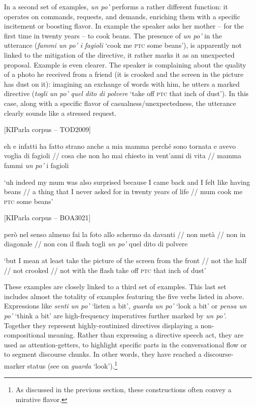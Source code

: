 In a second set of examples, \textit{un po’} performs a rather different function: it operates on commands, requests, and demands, enriching them with a specific incitement or boosting flavor. In example  the speaker asks her mother – for the first time in twenty years – to cook beans. The presence of \textit{un po’} in the utterance (\textit{fammi un po’ i fagioli} ‘cook me \textsc{ptc} some beans’), is apparently not linked to the mitigation of the directive, it rather marks it as an unexpected proposal. Example  is even clearer. The speaker is complaining about the quality of a photo he received from a friend (it is crooked and the screen in the picture has dust on it): imagining an exchange of words with him, he utters a marked directive (\textit{togli un po’ quel dito di polvere} ‘take off \textsc{ptc} that inch of dust’). In this case, along with a specific flavor of casualness/unexpectedness, the utterance clearly sounds like a stressed request.

\ea%
    \label{ex:key:71} [KIParla corpus – TOD2009]

eh e infatti ha fatto strano anche a mia mamma perché sono tornata e avevo voglia di fagioli // cosa che non ho mai chiesto in vent’anni di vita // mamma fammi \textit{un po’} i fagioli

\glt ‘uh indeed my mum was also surprised because I came back and I felt like having beans // a thing that I never asked for in twenty years of life // mum cook me \textsc{ptc} some beans’
\z

\ea%
    \label{ex:key:72}

          [KIParla corpus – BOA3021]

però nel senso almeno fai la foto allo schermo da davanti // non metà // non in diagonale // non con il flash togli \textit{un po’} quel dito di polvere

\glt ‘but I mean at least take the picture of the screen from the front // not the half // not crooked // not with the flash take off \textsc{ptc} that inch of dust’
    \z %

These examples are closely linked to a third set of examples. This last set includes almost the totality of examples featuring the five verbs listed in  above. Expressions like \textit{senti un po’} ‘listen a bit’, \textit{guarda un po’} ‘look a bit’ or \textit{pensa un po’} ‘think a bit’ are high-frequency imperatives further marked by \textit{un po’}. Together they represent highly-routinized directives displaying a non-compositional meaning. Rather than expressing a directive speech act, they are used as attention-getters, to highlight specific parts in the conversational flow or to segment discourse chunks. In other words, they have reached a discourse-marker status (see \citealt{Waltereit2002} on \textit{guarda} ‘look’).\footnote{As discussed in the previous section, these constructions often convey a mirative flavor.}

